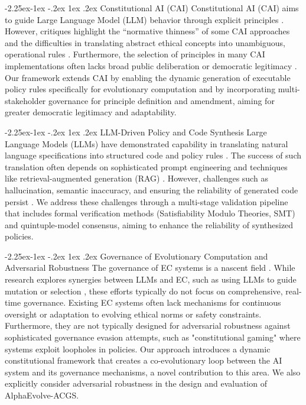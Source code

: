 \documentclass[manuscript,screen,review,anonymous,9pt]{acmart}
\makeatletter
\renewcommand\subsection{\@startsection{subsection}{2}{\z@}%
  {-2.25ex\@plus -1ex \@minus -.2ex}%
  {1ex \@plus .2ex}%
  {\normalfont\large\bfseries}}
\makeatother
\begin{document}
\subsection{Constitutional AI (CAI)}
Constitutional AI (CAI) aims to guide Large Language Model (LLM) behavior through explicit principles \cite{Bai2025ConstitutionalAI}. However, critiques highlight the ``normative thinness'' of some CAI approaches and the difficulties in translating abstract ethical concepts into unambiguous, operational rules \cite{DigiCon2025ConstitutionalAIThin, ChaconMenke2025CAISmallLLMs}. Furthermore, the selection of principles in many CAI implementations often lacks broad public deliberation or democratic legitimacy \cite{Hwang2025PublicCAI}. Our framework extends CAI by enabling the dynamic generation of executable policy rules specifically for evolutionary computation and by incorporating multi-stakeholder governance for principle definition and amendment, aiming for greater democratic legitimacy and adaptability.

\subsection{LLM-Driven Policy and Code Synthesis}
\label{subsec:related_llm_synthesis}
Large Language Models (LLMs) have demonstrated capability in translating natural language specifications into structured code and policy rules \cite{Almulla2024EmergenceLLMPolicy, ResearchGate2025AutoPAC, Li2025VeriCoder}. The success of such translation often depends on sophisticated prompt engineering and techniques like retrieval-augmented generation (RAG) \cite{AnalyticsVidhya2024PromptingTechniques, arXiv2025FutureWorkRAG}. However, challenges such as hallucination, semantic inaccuracy, and ensuring the reliability of generated code persist \cite{AAAI2025CodeHalu, Taeihagh2025Governing}. We address these challenges through a multi-stage validation pipeline that includes formal verification methods (Satisfiability Modulo Theories, SMT) and quintuple-model consensus, aiming to enhance the reliability of synthesized policies.

\subsection{Governance of Evolutionary Computation and Adversarial Robustness}
\label{subsec:related_ec_governance}
The governance of EC systems is a nascent field \cite{Chauhan2025ECLLMSurvey}. While research explores synergies between LLMs and EC, such as using LLMs to guide mutation or selection \cite{Nordin2024LLMGP}, these efforts typically do not focus on comprehensive, real-time governance. Existing EC systems often lack mechanisms for continuous oversight or adaptation to evolving ethical norms or safety constraints. Furthermore, they are not typically designed for adversarial robustness against sophisticated governance evasion attempts, such as "constitutional gaming" where systems exploit loopholes in policies. Our approach introduces a dynamic constitutional framework that creates a co-evolutionary loop between the AI system and its governance mechanisms, a novel contribution to this area. We also explicitly consider adversarial robustness in the design and evaluation of AlphaEvolve-ACGS.
\end{document}
